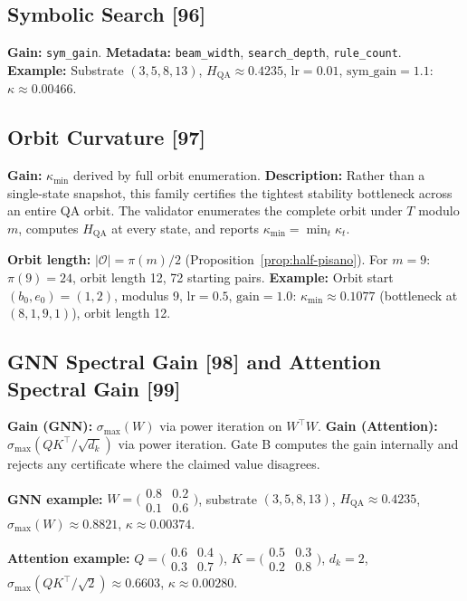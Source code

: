 \documentclass[11pt]{article}
\theoremstyle{definition}
\theoremstyle{remark}
\newcommand{\hqa}{H_{\mathrm{QA}}}
\newcommand{\kmin}{\kappa_{\min}}
\begin{document}
\subsection{Symbolic Search [96]}
\textbf{Gain:} \texttt{sym\_gain}. \textbf{Metadata:} \texttt{beam\_width},
\texttt{search\_depth}, \texttt{rule\_count}. \textbf{Example:} Substrate
$(3,5,8,13)$, $\hqa\approx 0.4235$, $\mathrm{lr}=0.01$, $\mathrm{sym\_gain}=1.1$:
$\kappa\approx0.00466$.

\subsection{Orbit Curvature [97]}
\textbf{Gain:} $\kmin$ derived by full orbit enumeration. \textbf{Description:}
Rather than a single-state snapshot, this family certifies the tightest stability
bottleneck across an entire QA orbit. The validator enumerates the complete orbit
under $T$ modulo $m$, computes $\hqa$ at every state, and reports
$\kmin=\min_t\kappa_t$.

\textbf{Orbit length:} $|\mathcal{O}|=\pi(m)/2$ (Proposition~\ref{prop:half-pisano}).
For $m=9$: $\pi(9)=24$, orbit length 12, 72 starting pairs. \textbf{Example:}
Orbit start $(b_0,e_0)=(1,2)$, modulus 9, $\mathrm{lr}=0.5$, $\mathrm{gain}=1.0$:
$\kmin\approx0.1077$ (bottleneck at $(8,1,9,1)$), orbit length 12.

\subsection{GNN Spectral Gain [98] and Attention Spectral Gain [99]}
\textbf{Gain (GNN):} $\sigma_{\max}(W)$ via power iteration on $W^\top W$.
\textbf{Gain (Attention):} $\sigma_{\max}(QK^\top/\!\sqrt{d_k})$ via power
iteration. Gate B computes the gain internally and rejects any certificate where
the claimed value disagrees.

\textbf{GNN example:} $W=\bigl(\begin{smallmatrix}0.8&0.2\\0.1&0.6\end{smallmatrix}\bigr)$,
substrate $(3,5,8,13)$, $\hqa\approx0.4235$, $\sigma_{\max}(W)\approx0.8821$,
$\kappa\approx0.00374$.

\textbf{Attention example:} $Q=\bigl(\begin{smallmatrix}0.6&0.4\\0.3&0.7\end{smallmatrix}\bigr)$,
$K=\bigl(\begin{smallmatrix}0.5&0.3\\0.2&0.8\end{smallmatrix}\bigr)$, $d_k=2$,
$\sigma_{\max}(QK^\top/\!\sqrt{2})\approx0.6603$, $\kappa\approx0.00280$.
\end{document}

